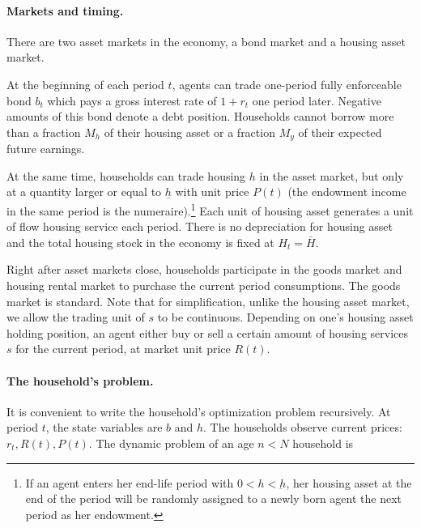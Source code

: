 \documentclass[a4paper,10pt]{article}
\begin{document}
\paragraph{Markets and timing.} There are two asset markets in the economy, a bond market and a housing asset market. 

At the beginning of each period $t$, agents can trade one-period fully enforceable bond $b_t$ which pays a gross interest rate of $1+r_t$ one period later. Negative amounts of this bond denote a debt position. Households cannot borrow more than a fraction $M_h$ of their housing asset or a fraction $M_y$ of their expected future earnings.

At the same time, households can trade housing $h$ in the asset market, but only at a quantity larger or equal to $\underline{h}$ with unit price $P(t)$ (the endowment income in the same period is the numeraire).\footnote{If an agent enters her end-life period with $0<h<\underbar{h}$, her housing asset at the end of the period will be randomly assigned to a newly born agent the next period as her endowment.} Each unit of housing asset generates a unit of flow housing service each period. There is no depreciation for housing asset and the total housing stock in the economy is fixed at $H_t=\bar{H}$.

Right after asset markets close, households participate in the goods market and housing rental market to purchase the current period consumptions. The goods market is standard. Note that for simplification, unlike the housing asset market, we allow the trading unit of $s$ to be continuous. Depending on one's housing asset holding position, an agent either buy or sell a certain amount of housing services $s$ for the current period, at market unit price $R(t)$.

\paragraph{The household's problem.}
It is convenient to write the household's optimization problem recursively. At period $t$, the state variables are $b$ and $h$. The households observe current prices: $r_t, R(t), P(t)$. The dynamic problem of an age $n<N$ household is

\end{document}
